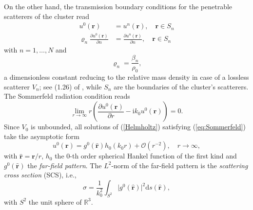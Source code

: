 \documentclass{article}
\begin{document}
On the other hand, the transmission boundary conditions for the penetrable scatterers of the cluster read
%
\begin{align}
\label{transmission}
    u^0(\mathbf{r})&=u^n(\mathbf{r}), \quad \mathbf{r}\in S_n\\
    \varrho_n\frac{\partial u^0(\mathbf{r})}{\partial n}&=\frac{\partial u^n(\mathbf{r})}{\partial n}, \quad \mathbf{r}\in S_n
    \label{BC_pen}
\end{align}
%
with $n=1,\ldots,N$ and $$\varrho_n=\frac{\beta_n}{\rho_0},$$ a dimensionless constant reducing to the relative mass density in case of a lossless scatterer $V_n$; see (1.26) of \cite{Martin_MS}, while $S_n$ are the boundaries of the cluster's scatterers. 
The Sommerfeld radiation condition reads
%
\begin{equation}\label{eq:Sommerfeld}
    \lim_{r\rightarrow\infty}r\left(\frac{\partial u^0(\mathbf{r})}{\partial r}-\mathrm{i}k_0u^0(\mathbf{r}) \right)=0.
\end{equation}
%
Since $V_0$ is unbounded, all solutions of (\ref{Helmholtz}) satisfying (\ref{eq:Sommerfeld}) take the asymptotic form \cite{Colton-Kress-IEM}
%
\begin{equation}\label{far-field}
    u^0(\mathbf{r})=g^0(\hat{\mathbf{r}})h_0(k_0r)+\mathcal{O}(r^{-2}), \quad r\rightarrow\infty,
\end{equation}
%
with $\hat{\mathbf{r}}=\mathbf{r}/r$, $h_0$ the $0$-th order spherical Hankel function of the first kind and $g^0(\hat{\mathbf{r}})$ the \emph{far-field pattern}. The $L^2$-norm of the far-field pattern is the \emph{scattering cross section} (SCS), i.e.,
%
\begin{equation}
\label{scs}
    \sigma=\frac{1}{k_0^2}\int_{S^2}\lvert g^0(\hat{\mathbf{r}})\rvert ^2\mathrm{d}s(\hat{\mathbf{r}}),
\end{equation}
%
with $S^2$ the unit sphere of $\mathbb{R}^3$.



\end{document}
